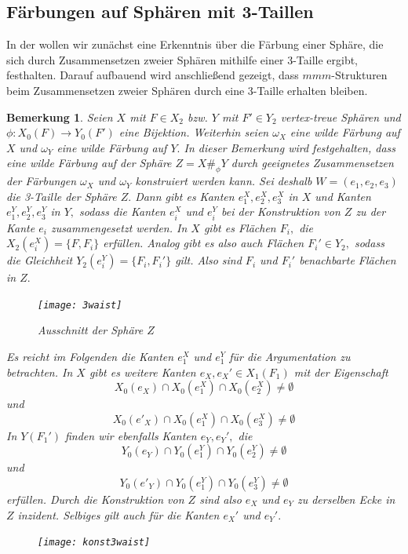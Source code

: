 \documentclass[12pt,titlepage,twoside,cleardoublepage]{article}
\theoremstyle{nummermitklammern}
\newtheorem{bemerkung}[temp]{Bemerkung}
\newtheorem{bemerkung}[zahl]{Bemerkung}
\numberwithin{equation}{section}
\begin{document}
\subsection{Färbungen auf Sphären mit 3-Taillen}
In der  wollen wir zunächst eine Erkenntnis über die Färbung einer Sphäre, die sich durch Zusammensetzen zweier Sphären mithilfe einer 3-Taille ergibt, festhalten. Darauf aufbauend wird anschließend gezeigt, dass $mmm$-Strukturen beim Zusammensetzen zweier Sphären durch eine 3-Taille erhalten bleiben.
\begin{bemerkung}\label{bemf}
Seien $X$ mit $F\in X_2$ bzw. $Y$ mit $F'\in Y_2$ vertex-treue Sphären und $\phi:X_0(F)\to Y_0(F')$ eine Bijektion. Weiterhin seien $\omega_X$ eine wilde Färbung auf $X$ und $\omega_Y$ eine wilde Färbung auf $Y.$
In dieser Bemerkung wird festgehalten, dass eine wilde Färbung auf der Sphäre $Z=X\#_{\phi}Y$ durch geeignetes Zusammensetzen der Färbungen $\omega_X$ und $\omega_Y$ konstruiert werden kann. Sei deshalb $W=(e_1,e_2,e_3)$ die 3-Taille der Sphäre $Z.$
 Dann gibt es Kanten $e_1^X,e_2^X,e_3^X$ in $X$ und Kanten $e_1^Y,e_2^Y,e_3^Y$ in $Y,$ sodass die Kanten $e_i^X$ und $e_i^Y$ bei der Konstruktion von $Z$ zu der Kante $e_i$ zusammengesetzt werden.
  In $X$ gibt es 
   Flächen $F_i,$ die $X_2(e_i^X)=\{F,F_i\}$ erfüllen.
   Analog gibt es also auch Flächen $F_i' \in Y_2,$ sodass die Gleichheit $Y_2(e_i^Y)=\{F_i,F_i'\}$ gilt. Also sind $F_i$ und $F_i'$ benachbarte Flächen in $Z.$
\begin{figure}[H]
\begin{center}
\texttt{[image: 3waist]}
\end{center}
\caption{Ausschnitt der Sphäre $Z$}
\end{figure}   
    Es reicht im Folgenden die Kanten $e_1^X$ und $e_1^Y$ für die Argumentation zu betrachten. In $X$ gibt es weitere Kanten $e_X,e_X'\in X_1(F_1)$ mit der Eigenschaft
\[
X_0(e_X)\cap X_0(e_1^X)\cap X_0(e_2^X)\neq \emptyset 
\] 
und 
\[
  X_0(e'_X)\cap X_0(e_1^X)\cap X_0(e_3^X)\neq \emptyset   
\]
In $Y(F_1')$ finden wir ebenfalls Kanten $e_Y,e_Y',$ die  
\[
   Y_0(e_Y)\cap Y_0(e_1^Y)\cap Y_0(e_2^Y)\neq \emptyset 
\]
und
\[
  Y_0(e'_Y)\cap Y_0(e_1^Y)\cap Y_0(e_3^Y)\neq \emptyset   
\]
erfüllen. Durch die Konstruktion von $Z$ sind also $e_X$ und $e_Y$ zu derselben Ecke in $Z$ inzident. Selbiges gilt auch für die Kanten $e_X'$ und $e_Y'.$ 
\begin{figure}[H]
\begin{center}
\texttt{[image: konst3waist]}
\end{center}

\end{figure}
\end{bemerkung}
\end{document}
